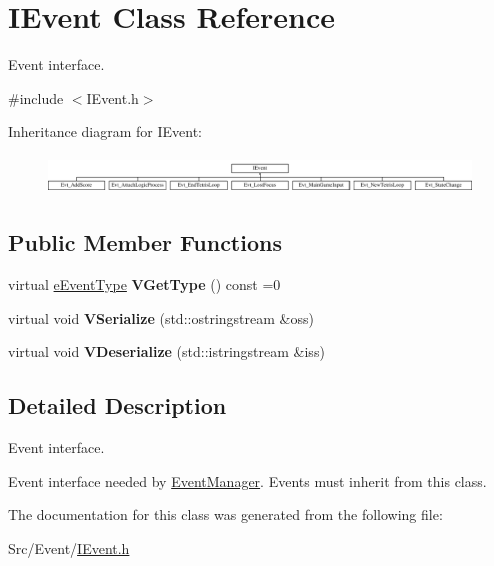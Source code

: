 \hypertarget{classIEvent}{\section{I\-Event Class Reference}
\label{classIEvent}
}


Event interface.  




{\ttfamily \#include $<$I\-Event.\-h$>$}

Inheritance diagram for I\-Event\-:\begin{figure}[H]
\begin{center}
\leavevmode
\includegraphics[height=1.012658cm]{classIEvent}
\end{center}
\end{figure}
\subsection*{Public Member Functions}
\begin{DoxyCompactItemize}
\item 
\hypertarget{classIEvent_a56fd35019ba84a7400485dcebfb49b66}{virtual \hyperlink{IEvent_8h_a052e637824ed8cb8a5e9d5d73b5b3c8b}{e\-Event\-Type} {\bfseries V\-Get\-Type} () const =0}\label{classIEvent_a56fd35019ba84a7400485dcebfb49b66}

\item 
\hypertarget{classIEvent_a7eda14ecfe3368b9a2b2a5a468fd34e5}{virtual void {\bfseries V\-Serialize} (std\-::ostringstream \&oss)}\label{classIEvent_a7eda14ecfe3368b9a2b2a5a468fd34e5}

\item 
\hypertarget{classIEvent_a1b7a25571aac7a613f1cf4e1856e0260}{virtual void {\bfseries V\-Deserialize} (std\-::istringstream \&iss)}\label{classIEvent_a1b7a25571aac7a613f1cf4e1856e0260}

\end{DoxyCompactItemize}


\subsection{Detailed Description}
Event interface. 

Event interface needed by \hyperlink{classEventManager}{Event\-Manager}. Events must inherit from this class. 

The documentation for this class was generated from the following file\-:\begin{DoxyCompactItemize}
\item 
Src/\-Event/\hyperlink{IEvent_8h}{I\-Event.\-h}\end{DoxyCompactItemize}

